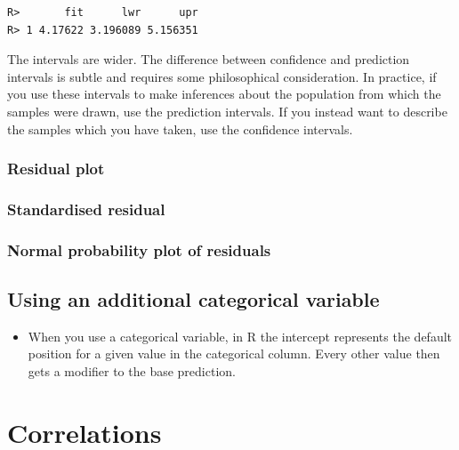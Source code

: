 \documentclass[english,10pt,a4paper,oneside]{book}
\providecommand{\tightlist}{%
  \setlength{\itemsep}{0pt}\setlength{\parskip}{0pt}}
\theoremstyle{definition}
\theoremstyle{definition}
\theoremstyle{definition}
\theoremstyle{remark}
\begin{document}
\begin{verbatim}
R>       fit      lwr      upr
R> 1 4.17622 3.196089 5.156351
\end{verbatim}

The intervals are wider. The difference between confidence and
prediction intervals is subtle and requires some philosophical
consideration. In practice, if you use these intervals to make
inferences about the population from which the samples were drawn, use
the prediction intervals. If you instead want to describe the samples
which you have taken, use the confidence intervals.

\hypertarget{residual-plot}{%
\subsection{Residual plot}\label{residual-plot}}

\hypertarget{standardised-residual}{%
\subsection{Standardised residual}\label{standardised-residual}}

\hypertarget{normal-probability-plot-of-residuals}{%
\subsection{Normal probability plot of
residuals}\label{normal-probability-plot-of-residuals}}

\hypertarget{using-an-additional-categorical-variable}{%
\section{Using an additional categorical
variable}\label{using-an-additional-categorical-variable}}

\begin{itemize}
\tightlist
\item
  When you use a categorical variable, in R the intercept represents the
  default position for a given value in the categorical column. Every
  other value then gets a modifier to the base prediction.
\end{itemize}

\hypertarget{correlations}{%
\chapter{Correlations}\label{correlations}}
\end{document}
